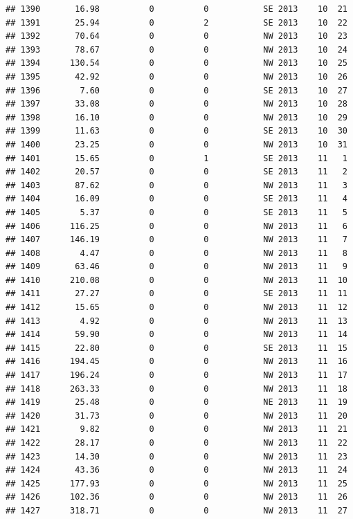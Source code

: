 \documentclass[
]{article}
\begin{document}
\begin{verbatim}
## 1390       16.98          0          0           SE 2013    10  21
## 1391       25.94          0          2           SE 2013    10  22
## 1392       70.64          0          0           NW 2013    10  23
## 1393       78.67          0          0           NW 2013    10  24
## 1394      130.54          0          0           NW 2013    10  25
## 1395       42.92          0          0           NW 2013    10  26
## 1396        7.60          0          0           SE 2013    10  27
## 1397       33.08          0          0           NW 2013    10  28
## 1398       16.10          0          0           NW 2013    10  29
## 1399       11.63          0          0           SE 2013    10  30
## 1400       23.25          0          0           NW 2013    10  31
## 1401       15.65          0          1           SE 2013    11   1
## 1402       20.57          0          0           SE 2013    11   2
## 1403       87.62          0          0           NW 2013    11   3
## 1404       16.09          0          0           SE 2013    11   4
## 1405        5.37          0          0           SE 2013    11   5
## 1406      116.25          0          0           NW 2013    11   6
## 1407      146.19          0          0           NW 2013    11   7
## 1408        4.47          0          0           NW 2013    11   8
## 1409       63.46          0          0           NW 2013    11   9
## 1410      210.08          0          0           NW 2013    11  10
## 1411       27.27          0          0           SE 2013    11  11
## 1412       15.65          0          0           NW 2013    11  12
## 1413        4.92          0          0           NW 2013    11  13
## 1414       59.90          0          0           NW 2013    11  14
## 1415       22.80          0          0           SE 2013    11  15
## 1416      194.45          0          0           NW 2013    11  16
## 1417      196.24          0          0           NW 2013    11  17
## 1418      263.33          0          0           NW 2013    11  18
## 1419       25.48          0          0           NE 2013    11  19
## 1420       31.73          0          0           NW 2013    11  20
## 1421        9.82          0          0           NW 2013    11  21
## 1422       28.17          0          0           NW 2013    11  22
## 1423       14.30          0          0           NW 2013    11  23
## 1424       43.36          0          0           NW 2013    11  24
## 1425      177.93          0          0           NW 2013    11  25
## 1426      102.36          0          0           NW 2013    11  26
## 1427      318.71          0          0           NW 2013    11  27

\end{verbatim}
\end{document}
